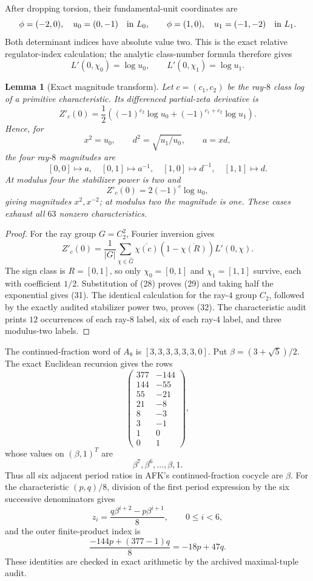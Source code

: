 \documentclass[11pt]{article}
\newtheorem{lemma}[theorem]{Lemma}
\begin{document}
After dropping torsion, their fundamental-unit coordinates are
\[
 \phi=(-2,0),\quad u_0=(0,-1)
 \quad\hbox{in }L_0,\qquad
 \phi=(1,0),\quad u_1=(-1,-2)
 \quad\hbox{in }L_1.
\]
Both determinant indices have absolute value two. This is the exact
relative regulator-index calculation; the analytic class-number
formula therefore gives
\[
 L'(0,\chi_0)=\log u_0,\qquad
 L'(0,\chi_1)=\log u_1.
\tag{28}
\]

\begin{lemma}[Exact magnitude transform]\label{lem:d8-magnitudes}
Let $c=(c_1,c_2)$ be the ray-$8$ class log of a primitive
characteristic.  Its differenced partial-zeta derivative is
\[
 Z'_c(0)=\frac12\left(
 (-1)^{c_2}\log u_0+
 (-1)^{c_1+c_2}\log u_1\right).
\tag{29}
\]
Hence, for
\[
 x^2=u_0,\qquad d^2=\sqrt{u_1/u_0},\qquad a=xd,
\tag{30}
\]
the four ray-$8$ magnitudes are
\[
 [0,0]\mapsto a,\quad [0,1]\mapsto a^{-1},\quad
 [1,0]\mapsto d^{-1},\quad [1,1]\mapsto d.
\tag{31}
\]
At modulus four the stabilizer power is two and
\[
 Z'_c(0)=2(-1)^c\log u_0,
\tag{32}
\]
giving magnitudes $x^2,x^{-2}$; at modulus two the magnitude is one.
These cases exhaust all $63$ nonzero characteristics.
\end{lemma}

\begin{proof}
For the ray group $G=C_2^2$, Fourier inversion gives
\[
 Z'_c(0)=\frac1{|G|}
 \sum_{\chi\in\widehat G}
 \overline{\chi(c)}(1-\overline{\chi(R)})L'(0,\chi).
\]
The sign class is $R=[0,1]$, so only
$\chi_0=[0,1]$ and $\chi_1=[1,1]$ survive, each with coefficient
$1/2$.  Substitution of \textup{(28)} proves \textup{(29)} and taking
half the exponential gives \textup{(31)}.  The identical calculation
for the ray-$4$ group $C_2$, followed by the exactly audited stabilizer
power two, proves \textup{(32)}.  The characteristic audit prints
$12$ occurrences of each ray-$8$ label, six of each ray-$4$ label,
and three modulus-two labels.
\end{proof}

The continued-fraction word of $A_8$ is
$[3,3,3,3,3,3,0]$.  Put $\beta=(3+\sqrt5)/2$.
The exact Euclidean recursion gives the rows
\[
\begin{pmatrix}
377&-144\\144&-55\\55&-21\\21&-8\\
8&-3\\3&-1\\1&0\\0&1
\end{pmatrix},
\tag{33}
\]
whose values on $(\beta,1)^T$ are
\[
\beta^7,\beta^6,\ldots,\beta,1.
\tag{34}
\]
Thus all six adjacent period ratios in AFK's continued-fraction
cocycle are $\beta$.  For the characteristic $(p,q)/8$, division of
the first period expression by the six successive denominators gives
\[
 z_i=\frac{q\beta^{i+2}-p\beta^{i+1}}8,\qquad 0\leq i<6,
\tag{35}
\]
and the outer finite-product index is
\[
 \frac{-144p+(377-1)q}{8}=-18p+47q.
\tag{36}
\]
These identities are checked in exact arithmetic by the archived
maximal-tuple audit.
\end{document}

